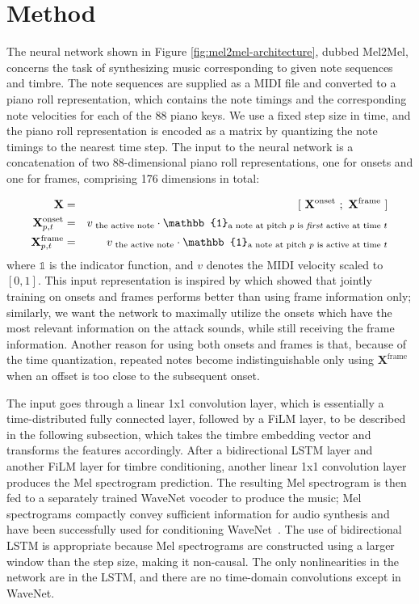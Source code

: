 \section{Method}\label{sec:method}

The neural network shown in Figure \ref{fig:mel2mel-architecture}, dubbed Mel2Mel, concerns the task of synthesizing music corresponding to given note sequences and timbre.
The note sequences are supplied as a MIDI file and converted to a piano roll representation, which contains the note timings and the corresponding note velocities for each of the 88 piano keys.
We use a fixed step size in time, and the piano roll representation is encoded as a matrix by quantizing the note timings to the nearest time step.
The input to the neural network is a concatenation of two 88-dimensional piano roll representations, one for onsets and one for frames, comprising 176 dimensions in total:

\begin{eqnarray*}
	\mathbf{X} & =&  [~ \mathbf{X}^{\textrm{onset}} ~;~ \mathbf{X}^{\textrm{frame}} ~] \\
	\mathbf{X}^{\textrm{onset}}_{p,t} &= & v_{\textrm{~the active note}} \cdot \mathbb{1}_{\textrm{a note at pitch $p$ is \textit{first} active at time $t$}} \\
	\mathbf{X}^{\textrm{frame}}_{p,t} &= & v_{\textrm{~the active note}} \cdot \mathbb{1}_{\textrm{a note at pitch $p$ is active at time $t$}}
\end{eqnarray*}
\noindent where $\mathbb{1}$ is the indicator function, and $v$ denotes the MIDI velocity scaled to $[0, 1]$.
This input representation is inspired by \cite{hawthorne2018onsetsframes} which showed that jointly training on onsets and frames performs better than using frame information only;
similarly, we want the network to maximally utilize the onsets which have the most relevant information on the attack sounds, while still receiving the frame information.
Another reason for using both onsets and frames is that, because of the time quantization, repeated notes become indistinguishable only using $\mathbf{X}^\textrm{frame}$ when an offset is too close to the subsequent onset.

The input goes through a linear 1x1 convolution layer, which is essentially a time-distributed fully connected layer, followed by a FiLM layer, to be described in the following subsection, which takes the timbre embedding vector and transforms the features accordingly.
After a bidirectional LSTM layer and another FiLM layer for timbre conditioning, another linear 1x1 convolution layer produces the Mel spectrogram prediction.
The resulting Mel spectrogram is then fed to a separately trained WaveNet vocoder to produce the music; Mel spectrograms compactly convey sufficient information for audio synthesis and have been successfully used for conditioning WaveNet~\cite{shen2018tacotron,ping2018deepvoice3}.
The use of bidirectional LSTM is appropriate because Mel spectrograms are constructed using a larger window than the step size, making it non-causal.
The only nonlinearities in the network are in the LSTM, and there are no time-domain convolutions except in WaveNet.


